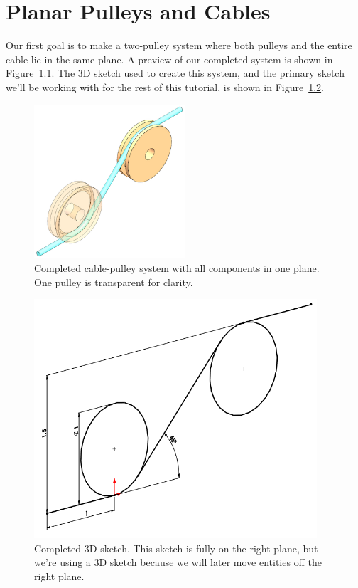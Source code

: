 \chapter{Planar Pulleys and Cables}

\label{sec:planar-pulleys}

Our first goal is to make a two-pulley system where both pulleys and the entire
cable lie in the same plane. A preview of our completed system is shown in
Figure~\ref{fig:completed-planar}. The 3D sketch used to create this system, and
the primary sketch we'll be working with for the rest of this tutorial, is shown in
Figure~\ref{fig:completed-planar-3d-sketch}.

\begin{figure}[H]
\begin{center}
  \includegraphics[height=2.25in]{images/figures/completed-planar.png}
\end{center}
\caption{Completed cable-pulley system with all components in one plane. One pulley is
transparent for clarity. \label{fig:completed-planar}}

\end{figure}

\begin{figure}[H]
\begin{center}
\includegraphics[height=3.5in]{images/figures/completed-planar-3d-sketch.png}
\end{center}
\caption{Completed 3D sketch. This sketch is fully on the right plane, but we're using
a 3D sketch because we will later move entities off the right plane.
\label{fig:completed-planar-3d-sketch}}
\end{figure}

